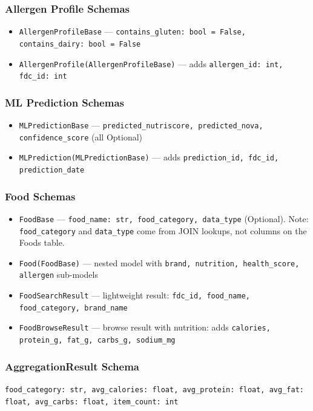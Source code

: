\documentclass[12pt,a4paper]{article}
\begin{document}
\subsubsection{Allergen Profile Schemas}
\begin{itemize}[nosep]
    \item \texttt{AllergenProfileBase} — \texttt{contains\_gluten: bool = False, contains\_dairy: bool = False}
    \item \texttt{AllergenProfile(AllergenProfileBase)} — adds \texttt{allergen\_id: int, fdc\_id: int}
\end{itemize}

\subsubsection{ML Prediction Schemas}
\begin{itemize}[nosep]
    \item \texttt{MLPredictionBase} — \texttt{predicted\_nutriscore, predicted\_nova, confidence\_score} (all Optional)
    \item \texttt{MLPrediction(MLPredictionBase)} — adds \texttt{prediction\_id, fdc\_id, prediction\_date}
\end{itemize}

\subsubsection{Food Schemas}
\begin{itemize}[nosep]
    \item \texttt{FoodBase} — \texttt{food\_name: str, food\_category, data\_type} (Optional). Note: \texttt{food\_category} and \texttt{data\_type} come from JOIN lookups, not columns on the Foods table.
    \item \texttt{Food(FoodBase)} — nested model with \texttt{brand, nutrition, health\_score, allergen} sub-models
    \item \texttt{FoodSearchResult} — lightweight result: \texttt{fdc\_id, food\_name, food\_category, brand\_name}
    \item \texttt{FoodBrowseResult} — browse result with nutrition: adds \texttt{calories, protein\_g, fat\_g, carbs\_g, sodium\_mg}
\end{itemize}

\subsubsection{AggregationResult Schema}
\texttt{food\_category: str, avg\_calories: float, avg\_protein: float, avg\_fat: float, avg\_carbs: float, item\_count: int}
\end{document}
